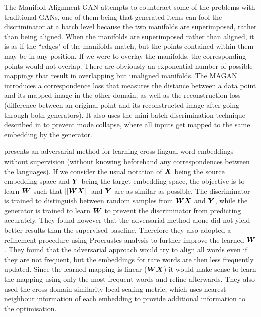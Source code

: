 The Manifold Alignment GAN \cite{magan} attempts to counteract some of the problems with traditional GANs, one of them being that generated items can fool the discriminator at a batch level because the two manifolds are superimposed, rather than being aligned. When the manifolds are superimposed rather than aligned, it is as if the ``edges" of the manifolds match, but the points contained within them may be in any position. If we were to overlay the manifolds, the corresponding points would not overlap. There are obviously an exponential number of possible mappings that result in overlapping but unaligned manifolds. The MAGAN introduces a correspondence loss that measures the distance between a data point and its mapped image in the other domain, as well as the reconstruction loss (difference between an original point and its reconstructed image after going through both generators). It also uses the mini-batch discrimination technique described in \cite{ImprovedTechniquesTrainingGANS} to prevent mode collapse, where all inputs get mapped to the same embedding by the generator.

\cite{wordtranslationwithoutparalleldata} presents an adversarial method for learning cross-lingual word embeddings without supervision (without knowing beforehand any correspondences between the languages). If we consider the usual notation of $\boldsymbol{X}$ being the source embedding space and $\boldsymbol{Y}$ being the target embedding space, the objective is to learn $\boldsymbol{W}$ such that $||\boldsymbol{W} \boldsymbol{X}||$ and $\boldsymbol{Y}$ are as similar as possible. The discriminator is trained to distinguish between random samples from $\boldsymbol{W} \boldsymbol{X}$ and $\boldsymbol{Y}$, while the generator is trained to learn $\boldsymbol{W}$ to prevent the discriminator from predicting accurately. They found however that the adversarial method alone did not yield better results than the supervised baseline. Therefore they also adopted a refinement procedure using Procrustes analysis to further improve the learned $\boldsymbol{W}$. They found that the adversarial approach would try to align all words even if they are not frequent, but the embeddings for rare words are then less frequently updated. Since the learned mapping is linear ($\boldsymbol{W} \boldsymbol{X}$) it would make sense to learn the mapping using only the most frequent words and refine afterwards. They also used the cross-domain similarity local scaling metric, which uses nearest neighbour information of each embedding to provide additional information to the optimisation.

